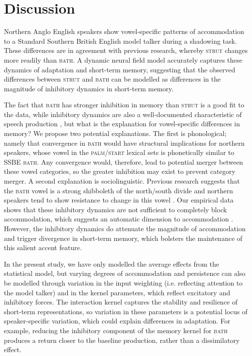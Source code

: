 \documentclass[10pt,letterpaper]{article}
\begin{document}
\section{Discussion}
\label{sec:discussion}

Northern Anglo English speakers show vowel-specific patterns of accommodation to a Standard Southern British English model talker during a shadowing task. These differences are in agreement with previous research, whereby \textsc{strut} changes more readily than \textsc{bath}. A dynamic neural field model accurately captures these dynamics of adaptation and short-term memory, suggesting that the observed differences between \textsc{strut} and \textsc{bath} can be modelled as differences in the magnitude of inhibitory dynamics in short-term memory.

The fact that \textsc{bath} has stronger inhibition in memory than \textsc{strut} is a good fit to the data, while inhibitory dynamics are also a well-documented characteristic of speech production \citep{stern-shaw2023, tilsen2019}, but what is the explanation for vowel-specific differences in memory? We propose two potential explanations. The first is phonological; namely that convergence in \textsc{bath} would have structural implications for northern speakers, whose vowel in the \textsc{palm/start} lexical sets is phonetically similar to SSBE \textsc{bath}. Any convergence would, therefore, lead to potential merger between these vowel categories, so the greater inhibition may exist to prevent category merger. A second explanation is sociolinguistic. Previous research suggests that the \textsc{bath} vowel is a strong shibboleth of the north/south divide \citep{wells1982} and northern speakers tend to show resistance to change in this vowel \citep{evans-iverson2007}. Our empirical data shows that these inhibitory dynamics are not sufficient to completely block accommodation, which suggests an automatic dimension to accommodation \citep{goldinger1998}. However, the inhibitory dynamics do attenuate the magnitude of accommodation and trigger divergence in short-term memory, which bolsters the maintenance of this salient accent feature.

In the present study, we have only modelled the average effects from the statistical model, but varying degrees of accommodation and persistence can also be modelled through variation in the input weighting (i.e. reflecting attention to the model talker) and in the kernel parameters, which reflect excitatory and inhibitory forces. The interaction kernel captures the stability and resilience of short-term representations, so variation in these parameters is a potential locus of speaker-specific variation, which could explain differences in adaptation. For example, reducing the inhibitory component of the memory kernel for \textsc{bath} produces a return closer to the baseline production, rather than a dissimilatory effect.
\end{document}
